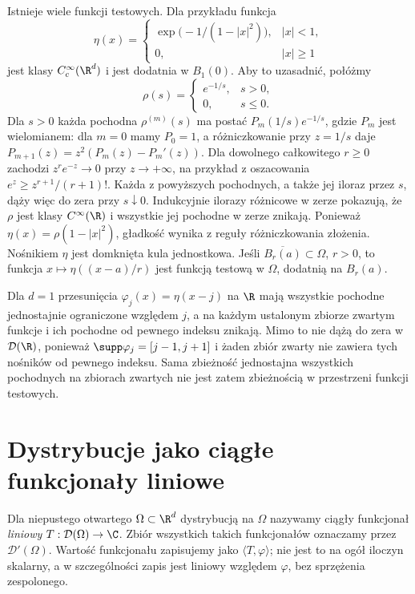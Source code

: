 Istnieje wiele funkcji testowych. Dla przykładu funkcja
\[
 \eta(x)=\begin{cases}
 \exp\!\bigl(-1/(1-|x|^2)\bigr),& |x|<1,\\
 0,& |x|\ge1
 \end{cases}
\]
jest klasy $C_c^\infty(\R^d)$ i jest dodatnia w $B_1(0)$.
Aby to uzasadnić, połóżmy
\[
 \rho(s)=
 \begin{cases}e^{-1/s},&s>0,\\0,&s\le0.\end{cases}
\]
Dla $s>0$ każda pochodna $\rho^{(m)}(s)$ ma postać
$P_m(1/s)e^{-1/s}$, gdzie $P_m$ jest wielomianem:
dla $m=0$ mamy $P_0=1$, a różniczkowanie przy
$z=1/s$ daje $P_{m+1}(z)=z^2(P_m(z)-P_m'(z))$.
Dla dowolnego całkowitego $r\ge0$ zachodzi
$z^r e^{-z}\to0$ przy $z\to+\infty$, na przykład
z oszacowania $e^z\ge z^{r+1}/(r+1)!$.
Każda z powyższych pochodnych, a także jej iloraz
przez $s$, dąży więc do zera przy $s\downarrow0$.
Indukcyjnie ilorazy różnicowe w zerze pokazują,
że $\rho$ jest klasy $C^\infty(\R)$ i wszystkie
jej pochodne w zerze znikają.
Ponieważ $\eta(x)=\rho(1-|x|^2)$, gładkość wynika
z reguły różniczkowania złożenia. Nośnikiem
$\eta$ jest domknięta kula jednostkowa.
Jeśli $\overline{B_r(a)}\subset\Omega$, $r>0$,
to funkcja $x\mapsto\eta((x-a)/r)$ jest funkcją
testową w $\Omega$, dodatnią na $B_r(a)$.

\begin{uwaga}
Dla $d=1$ przesunięcia $\varphi_j(x)=\eta(x-j)$ na $\R$
mają wszystkie pochodne jednostajnie ograniczone
względem $j$, a na każdym ustalonym zbiorze zwartym
funkcje i ich pochodne od pewnego indeksu znikają.
Mimo to nie dążą do zera w $\mathcal D(\R)$, ponieważ
$\supp\varphi_j=[j-1,j+1]$ i żaden zbiór zwarty
nie zawiera tych nośników od pewnego indeksu.
Sama zbieżność jednostajna wszystkich pochodnych
na zbiorach zwartych nie jest zatem zbieżnością
w przestrzeni funkcji testowych.
\end{uwaga}

\section{Dystrybucje jako ciągłe funkcjonały liniowe}
\label{sec:pde7-def}

\begin{definicja}[Dystrybucja]
\label{def:pde7-distribution}
Dla niepustego otwartego $\Omega\subset\R^d$ dystrybucją na $\Omega$
nazywamy ciągły funkcjonał \emph{liniowy} $T:\mathcal D(\Omega)\to\C$.
Zbiór wszystkich takich funkcjonałów oznaczamy przez $\mathcal D'(\Omega)$.
Wartość funkcjonału zapisujemy jako $\langle T,\varphi\rangle$;
nie jest to na ogół iloczyn skalarny, a w szczególności
zapis jest liniowy względem $\varphi$, bez sprzężenia zespolonego.
\end{definicja}

